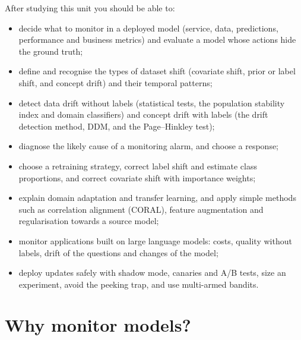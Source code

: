\begin{objectives}
After studying this unit you should be able to:
\begin{itemize}
  \item decide what to monitor in a deployed model (service, data, predictions, performance and
        business metrics) and evaluate a model whose actions hide the ground truth;
  \item define and recognise the types of dataset shift (covariate shift, prior or label shift, and
        concept drift) and their temporal patterns;
  \item detect data drift without labels (statistical tests, the population stability index and domain
        classifiers) and concept drift with labels (the drift detection method, DDM, and the Page--Hinkley test);
\item diagnose the likely cause of a monitoring alarm, and choose a response;
  \item choose a retraining strategy, correct label shift and estimate class proportions, and correct
        covariate shift with importance weights;
  \item explain domain adaptation and transfer learning, and apply simple methods such as correlation alignment (CORAL),
        feature augmentation and regularisation towards a source model;
  \item monitor applications built on large language models: costs, quality without labels, drift of the
        questions and changes of the model;
\item deploy updates safely with shadow mode, canaries and A/B tests, size an experiment, avoid the
peeking trap, and use multi-armed bandits.
\end{itemize}
\end{objectives}

\section{Why monitor models?}\label{sec:whymonitor}

